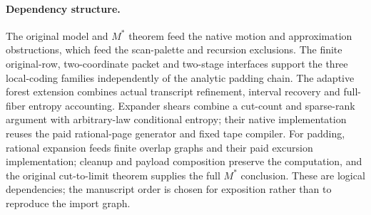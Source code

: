 \paragraph{Dependency structure.}
The original model and $M^*$ theorem feed the native motion and approximation
obstructions, which feed the scan-palette and recursion exclusions. The
finite original-row, two-coordinate packet and two-stage interfaces support the
three local-coding families independently of the analytic padding chain.
The adaptive forest extension combines actual transcript refinement, interval
recovery and full-fiber entropy accounting. Expander shears combine a cut-count
and sparse-rank argument with arbitrary-law conditional entropy; their native
implementation reuses the paid rational-page generator and fixed tape compiler.
For padding, rational expansion feeds finite overlap graphs and their
paid excursion implementation; cleanup and payload composition preserve
the computation, and the original cut-to-limit theorem supplies the
full $M^*$ conclusion. These are logical dependencies; the manuscript
order is chosen for exposition rather than to reproduce the import graph.
